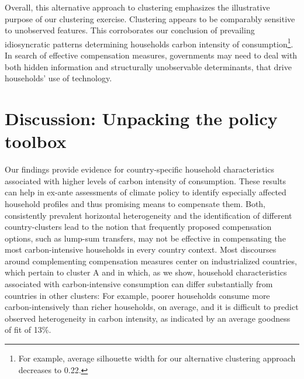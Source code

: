 \documentclass[12pt, a4paper]{article}
\begin{document}
Overall, this alternative approach to clustering emphasizes the illustrative purpose of our clustering exercise. Clustering appears to be comparably sensitive to unobserved features. This corroborates our conclusion of prevailing idiosyncratic patterns determining households carbon intensity of consumption\footnote{For example, average silhouette width for our alternative clustering approach decreases to 0.22.}. In search of effective compensation measures, governments may need to deal with both hidden information and structurally unobservable determinants, that drive households' use of technology.

\section{Discussion: Unpacking the policy toolbox} \label{sec:discussion}

Our findings provide evidence for country-specific household characteristics associated with higher levels of carbon intensity of consumption. These results can help in ex-ante assessments of climate policy to identify especially affected household profiles and thus promising means to compensate them. Both, consistently prevalent horizontal heterogeneity and the identification of different country-clusters lead to the notion that frequently proposed compensation options, such as lump-sum transfers, may not be effective in compensating the most carbon-intensive households in every country context. Most discourses around complementing compensation measures center on industrialized countries, which pertain to cluster A and in which, as we show, household characteristics associated with carbon-intensive consumption can differ substantially from countries in other clusters: For example, poorer households consume more carbon-intensively than richer households, on average, and it is difficult to predict observed heterogeneity in carbon intensity, as indicated by an average goodness of fit of 13\%.
\end{document}
